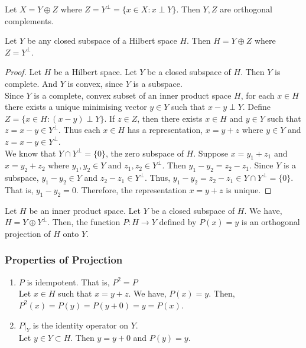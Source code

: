 \begin{definition}
	Let $X = Y \oplus Z$ where $Z =  Y^\perp = \{ x \in X : x \perp Y\}$.
	Then $Y,Z$ are orthogonal complements.
\end{definition}

\begin{theorem}
	Let $Y$ be any closed subspace of a Hilbert space $H$.
	Then $H = Y \oplus Z$ where $Z = Y^\perp$.
\end{theorem}
\begin{proof}
	Let $H$ be a Hilbert space.
	Let $Y$ be a closed subspace of $H$.
	Then $Y$ is complete.
	And $Y$ is convex, since $Y$ is a subspace.\\

	Since $Y$ is a complete, convex subset of an inner product space $H$, for each $x \in H$ there exists a unique minimising vector $y \in Y$ such that $x-y \perp Y$.
	Define $Z = \{ x \in H : (x-y) \perp Y\}$.
	If $z \in Z$, then there exists $x \in H$ and $y \in Y$ such that $z=x-y \in Y^\perp$.
	Thus each $x \in H$ has a representation, $x = y+z$ where $y \in Y$ and $z = x-y \in Y^\perp$. \\

	We know that $Y \cap Y^\perp = \{ 0 \}$, the zero subspace of $H$.
	Suppose $x = y_1+z_1$ and $x = y_2+z_2$ where $y_1,y_2 \in Y$ and $z_1,z_2 \in Y^\perp$.
	Then $y_1-y_2 = z_2-z_1$.
	Since $Y$ is a subspace, $y_1-y_2 \in Y$ and $z_2-z_1 \in Y^\perp$.
	Thus, $y_1-y_2 = z_2 - z_1 \in Y \cap Y^\perp = \{ 0 \}$.
	That is, $y_1 - y_2 = 0$.
	Therefore, the representation $x=y+z$ is unique.
\end{proof}

\begin{definition}[Projection]
	Let $H$ be an inner product space.
	Let $Y$ be a closed subspace of $H$.
	We have, $H = Y \oplus Y^\perp$.
	Then, the function $P : H \to Y$ defined by $P(x) = y$ is an orthogonal projection of $H$ onto $Y$.
\end{definition}

\subsubsection{Properties of Projection}
\begin{enumerate}
	\item $P$ is idempotent. That is, $P^2 = P$\\
		Let $x \in H$ such that $x = y+z$.
		We have, $P(x) = y$.
		Then, $P^2(x) = P(y) = P(y+0) = y = P(x)$.
	\item $P|_Y$ is the identity operator on $Y$.\\
		Let $y \in Y \subset H$.
		Then $y = y + 0$ and $P(y) = y$.
\end{enumerate}

